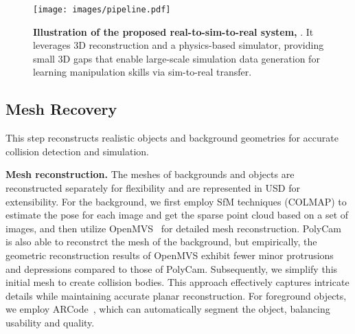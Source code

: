 \begin{figure*}[!htbp]
    \centering
    \texttt{[image: images/pipeline.pdf]}
    \vspace{-5pt}
    \caption{\textbf{Illustration of the proposed real-to-sim-to-real system, \our}. It leverages 3D reconstruction and a physics-based simulator, providing small 3D gaps that enable large-scale simulation data generation for learning manipulation skills via sim-to-real transfer.}
    \label{fig:main framework}
\end{figure*}


\subsection{Mesh Recovery}
\label{sec:method:mesh_recovery}
This step reconstructs realistic objects and background geometries for accurate collision detection and simulation.

\noindent\textbf{Mesh reconstruction.} 
The meshes of backgrounds and objects are reconstructed separately for flexibility and are represented in USD for extensibility.
For the background, we first employ SfM techniques (COLMAP) to estimate the pose for each image and get the sparse point cloud based on a set of images, and then utilize OpenMVS~\citep{openmvs2020} for detailed mesh reconstruction. 
PolyCam~\citep{polycam2020} is also able to reconstrct the mesh of the background, but empirically, the geometric reconstruction results of OpenMVS exhibit fewer minor protrusions and depressions compared to those of PolyCam.
Subsequently, we simplify this initial mesh to create collision bodies. This approach effectively captures intricate details while maintaining accurate planar reconstruction. For foreground objects, we employ ARCode~\citep{arcode2022}, which can automatically segment the object, balancing usability and quality.

